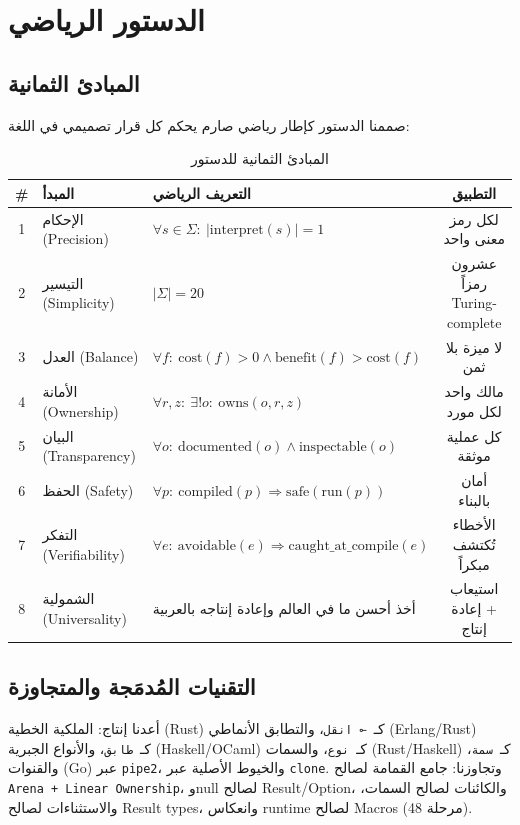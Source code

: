 \documentclass[sigconf]{acmart}
\begin{document}
\section{الدستور الرياضي}
\label{sec:constitution}

\subsection{المبادئ الثمانية}
\label{sec:constitution:principles}

صممنا الدستور كإطار رياضي صارم يحكم كل قرار تصميمي في اللغة:

\begin{table}[h]
\centering
\caption{المبادئ الثمانية للدستور}
\label{tab:principles}
\begin{tabular}{cllc}
\toprule
\textbf{\#} & \textbf{المبدأ} & \textbf{التعريف الرياضي} & \textbf{التطبيق} \\
\midrule
1 & الإحكام (Precision) & $\forall s \in \Sigma:\ |\mathrm{interpret}(s)| = 1$ & لكل رمز معنى واحد \\
2 & التيسير (Simplicity) & $|\Sigma| = 20$ & عشرون رمزاً Turing-complete \\
3 & العدل (Balance) & $\forall f:\ \mathrm{cost}(f) > 0 \land \mathrm{benefit}(f) > \mathrm{cost}(f)$ & لا ميزة بلا ثمن \\
4 & الأمانة (Ownership) & $\forall r,z:\ \exists! o:\ \mathrm{owns}(o,r,z)$ & مالك واحد لكل مورد \\
5 & البيان (Transparency) & $\forall o:\ \mathrm{documented}(o) \land \mathrm{inspectable}(o)$ & كل عملية موثقة \\
6 & الحفظ (Safety) & $\forall p:\ \mathrm{compiled}(p) \Rightarrow \mathrm{safe}(\mathrm{run}(p))$ & أمان بالبناء \\
7 & التفكر (Verifiability) & $\forall e:\ \mathrm{avoidable}(e) \Rightarrow \mathrm{caught\_at\_compile}(e)$ & الأخطاء تُكتشف مبكراً \\
8 & الشمولية (Universality) & أخذ أحسن ما في العالم وإعادة إنتاجه بالعربية & استيعاب + إعادة إنتاج \\
\bottomrule
\end{tabular}
\end{table}

\subsection{التقنيات المُدمَجة والمتجاوزة}
\label{sec:constitution:tech}

أعدنا إنتاج: الملكية الخطية (Rust) كـ\ \texttt{⊸ انقل}، والتطابق الأنماطي
(Erlang/Rust) كـ\ \texttt{طابق}، والأنواع الجبرية (Haskell/OCaml) كـ\ \texttt{نوع}،
والسمات (Rust/Haskell) كـ\ \texttt{سمة}، والقنوات (Go) عبر \texttt{pipe2}،
والخيوط الأصلية عبر \texttt{clone}. وتجاوزنا: جامع القمامة لصالح \texttt{Arena +
Linear Ownership}، وnull لصالح Result/Option، والكائنات لصالح السمات،
والاستثناءات لصالح Result types، وانعكاس runtime لصالح Macros (مرحلة 48).
\end{document}
